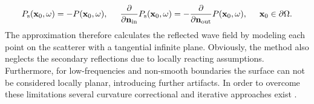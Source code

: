 \begin{itemize}
\begin{equation}
P_{\mathrm{s}}(\mathbf{x}_0,\omega) = -P(\mathbf{x}_0,\omega), \hspace{5mm} \frac{\partial}{\partial \mathbf{n}_{\mathrm{in}}} P_{\mathrm{s}}(\mathbf{x}_0,\omega) = -\frac{\partial}{\partial \mathbf{n}_{\mathrm{out}}} P(\mathbf{x}_0,\omega), \hspace{5mm} \mathbf{x}_0 \in \partial \Omega.
\label{Eq:SFS_theory:tangent_plane}
\end{equation}
The approximation therefore calculates the reflected wave field by modeling each point on the scatterer with a tangential infinite plane. Obviously, the method also neglects the secondary reflections due to locally reacting assumptions. Furthermore, for low-frequencies and non-smooth boundaries the surface can not be considered locally planar, introducing further artifacts. In order to overcome these limitations several curvature correctional and iterative approaches exist \cite{Elfouhaily2004}.
\end{itemize}

